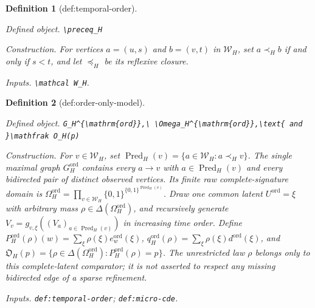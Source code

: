 \documentclass{article}
\newtheorem{definition}{Definition}
\begin{document}
\begin{definition}[def:temporal-order]\label{def:temporal-order}
\par\smallskip\noindent\emph{Defined object.} \texttt{\textbackslash{}\allowbreak{}preceq\_\allowbreak{}H}
\par\smallskip\noindent\emph{Construction.} For vertices \(a=(u,s)\) and \(b=(v,t)\) in \(\mathcal W_H\), set \(a\prec_H b\) if and only if \(s<t\), and let \(\preceq_H\) be its reflexive closure.
\par\smallskip\noindent\emph{Inputs.} \texttt{\textbackslash{}\allowbreak{}mathcal W\_\allowbreak{}H}.
\end{definition}

\begin{definition}[def:order-only-model]\label{def:order-only-model}
\par\smallskip\noindent\emph{Defined object.} \texttt{G\_\allowbreak{}H\textasciicircum{}\{\textbackslash{}\allowbreak{}mathrm\{ord\}\allowbreak{}\}\allowbreak{},\allowbreak{}\textbackslash{}\allowbreak{} \textbackslash{}\allowbreak{}Omega\_\allowbreak{}H\textasciicircum{}\{\textbackslash{}\allowbreak{}mathrm\{ord\}\allowbreak{}\}\allowbreak{},\allowbreak{}\textbackslash{}\allowbreak{}text\{ and \}\allowbreak{}\textbackslash{}\allowbreak{}mathfrak O\_\allowbreak{}H(p)}
\par\smallskip\noindent\emph{Construction.} For \(v\in\mathcal W_H\), set \(\operatorname{Pred}_H(v)=\{a\in\mathcal W_H:a\prec_H v\}\). The single maximal graph \(G_H^{\mathrm{ord}}\) contains every \(a\to v\) with \(a\in\operatorname{Pred}_H(v)\) and every bidirected pair of distinct observed vertices. Its finite raw complete-signature domain is \(\Omega_H^{\mathrm{ord}}=\prod_{v\in\mathcal W_H}\{0,1\}^{\{0,1\}^{\operatorname{Pred}_H(v)}}\). Draw one common latent \(U^{\mathrm{ord}}=\xi\) with arbitrary mass \(\rho\in\Delta(\Omega_H^{\mathrm{ord}})\), and recursively generate \(V_v=g_{v,\xi}((V_a)_{a\in\operatorname{Pred}_H(v)})\) in increasing time order. Define \(P_H^{\mathrm{ord}}(\rho)(w)=\sum_{\xi}\rho(\xi)e_w^{\mathrm{ord}}(\xi)\), \(q_H^{\mathrm{ord}}(\rho)=\sum_{\xi}\rho(\xi)d^{\mathrm{ord}}(\xi)\), and \(\mathfrak O_H(p)=\{\rho\in\Delta(\Omega_H^{\mathrm{ord}}):P_H^{\mathrm{ord}}(\rho)=p\}\). The unrestricted law \(\rho\) belongs only to this complete-latent comparator; it is not asserted to respect any missing bidirected edge of a sparse refinement.
\par\smallskip\noindent\emph{Inputs.} \texttt{def:\allowbreak{}temporal-\allowbreak{}order}; \texttt{def:\allowbreak{}micro-\allowbreak{}cde}.
\end{definition}
\end{document}
